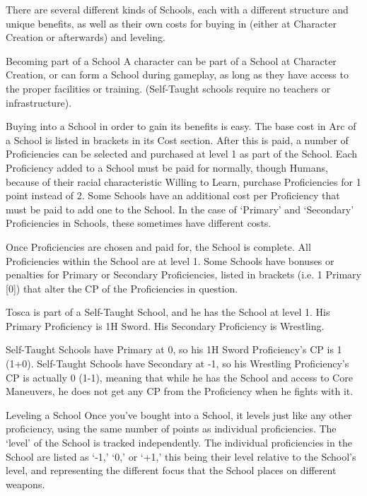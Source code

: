 \documentclass[oneside,11pt,english]{book}
\begin{document}
There are several different kinds of Schools, each with a different structure and unique benefits, as well as 
their own costs for buying in (either at Character Creation or afterwards) and leveling. 

 

Becoming part of a School 
A character can be part of a School at Character Creation, or can form a School during gameplay, as long 
as they have access to the proper facilities or training. (Self-Taught schools require no teachers or 
infrastructure). 

 

Buying into a School in order to gain its benefits is easy. The base cost in Arc of a School is listed in 
brackets in its Cost section. After this is paid, a number of Proficiencies can be selected and purchased at 
level 1 as part of the School. Each Proficiency added to a School must be paid for normally, though 
Humans, because of their racial characteristic Willing to Learn, purchase Proficiencies for 1 point instead 
of 2. Some Schools have an additional cost per Proficiency that must be paid to add one to the School. In 
the case of ‘Primary’ and ‘Secondary’ Proficiencies in Schools, these sometimes have different costs. 

 

Once Proficiencies are chosen and paid for, the School is complete. All Proficiencies within the School 
are at level 1. Some Schools have bonuses or penalties for Primary or Secondary Proficiencies, listed in 
brackets (i.e. 1 Primary [0]) that alter the CP of the Proficiencies in question. 

 

Tosca is part of a Self-Taught School, and he has the School at level 1. His Primary Proficiency is 1H 
Sword. His Secondary Proficiency is Wrestling. 

 

Self-Taught Schools have Primary at 0, so his 1H Sword Proficiency’s CP is 1 (1+0). Self-Taught Schools 
have Secondary at -1, so his Wrestling Proficiency’s CP is actually 0 (1-1), meaning that while he has the 
School and access to Core Maneuvers, he does not get any CP from the Proficiency when he fights with 
it. 

 

Leveling a School 
Once you’ve bought into a School, it levels just like any other proficiency, using the same number of 
points as individual proficiencies. The ‘level’ of the School is tracked independently. The individual 
proficiencies in the School are listed as ‘-1,’ ‘0,’ or ‘+1,’ this being their level relative to the School’s 
level, and representing the different focus that the School places on different weapons. 
\end{document}
